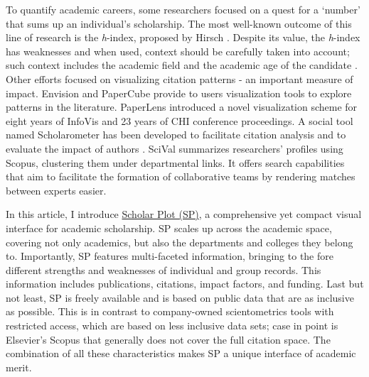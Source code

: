 To quantify academic careers, some researchers focused on a quest for a `number' that sums up an individual's scholarship. The most well-known outcome of this line of research is the {\it h}-index, proposed by Hirsch \cite{Hirsch:2005}. Despite its value, the {\it h}-index has weaknesses and when used, context should be carefully taken into account; such context includes the academic field and the academic age of the candidate \cite{Bornmann:2009}. Other efforts focused on visualizing citation patterns \cite{Chen:2001, Leydesdorff:2007} - an important measure of impact. Envision \cite{Nowell:1997} and PaperCube \cite{Bergstrom:2009} provide to users visualization tools to explore patterns in the literature. PaperLens \cite{Lee:2005} introduced a novel visualization scheme for eight years of InfoVis and 23 years of CHI conference proceedings.
A social tool named Scholarometer has been developed to facilitate citation analysis and to evaluate the impact of authors \cite{Kaur:2014}.
SciVal \cite{Vardell:2011} summarizes researchers' profiles using Scopus, clustering them under departmental links.  It offers search capabilities that aim to facilitate the formation of collaborative teams by rendering matches between experts easier.

In this article, I introduce \href{http://scholarplot.com}{Scholar Plot (SP)}, a comprehensive yet compact visual interface for academic scholarship. SP scales up across the academic space, covering not only academics, but also the departments and colleges they belong to. Importantly, SP features multi-faceted information, bringing to the fore different strengths and weaknesses of individual and group records. This information includes publications, citations, impact factors, and funding. Last but not least, SP is freely available and is based on public  data that are as inclusive as possible. This is in contrast to  company-owned scientometrics tools with restricted access, which are based on less inclusive data sets; case in point is Elsevier's Scopus that generally does not cover the full citation space. The combination of all these characteristics makes SP a unique interface of academic merit. 

